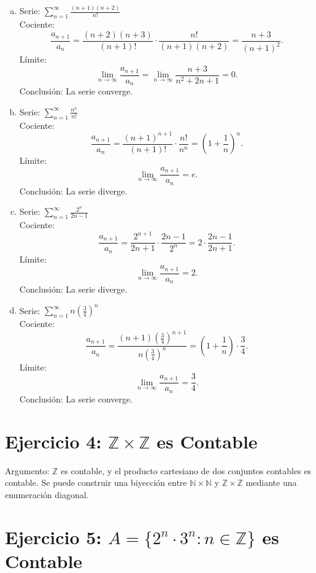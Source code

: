 \documentclass[12pt,a4paper]{article}
\begin{document}
\begin{enumerate}[a)]
    \item Serie: $\sum_{n=1}^{\infty} \frac{(n+1)(n+2)}{n!}$ \\
    Cociente:
    \[
    \frac{a_{n+1}}{a_n} = \frac{(n+2)(n+3)}{(n+1)!} \cdot \frac{n!}{(n+1)(n+2)} = \frac{n+3}{(n+1)^2}.
    \]
    Límite:
    \[
    \lim_{n \to \infty} \frac{a_{n+1}}{a_n} = \lim_{n \to \infty} \frac{n+3}{n^2 + 2n + 1} = 0.
    \]
    Conclusión: La serie converge.

    \item Serie: $\sum_{n=1}^{\infty} \frac{n^n}{n!}$ \\
    Cociente:
    \[
    \frac{a_{n+1}}{a_n} = \frac{(n+1)^{n+1}}{(n+1)!} \cdot \frac{n!}{n^n} = \left(1 + \frac{1}{n}\right)^n.
    \]
    Límite:
    \[
    \lim_{n \to \infty} \frac{a_{n+1}}{a_n} = e.
    \]
    Conclusión: La serie diverge.

    \item Serie: $\sum_{n=1}^{\infty} \frac{2^n}{2n - 1}$ \\
    Cociente:
    \[
    \frac{a_{n+1}}{a_n} = \frac{2^{n+1}}{2n+1} \cdot \frac{2n-1}{2^n} = 2 \cdot \frac{2n-1}{2n+1}.
    \]
    Límite:
    \[
    \lim_{n \to \infty} \frac{a_{n+1}}{a_n} = 2.
    \]
    Conclusión: La serie diverge.

    \item Serie: $\sum_{n=1}^{\infty} n \left( \frac{3}{4} \right)^n$ \\
    Cociente:
    \[
    \frac{a_{n+1}}{a_n} = \frac{(n+1)\left( \frac{3}{4} \right)^{n+1}}{n \left( \frac{3}{4} \right)^n} = \left(1 + \frac{1}{n}\right) \cdot \frac{3}{4}.
    \]
    Límite:
    \[
    \lim_{n \to \infty} \frac{a_{n+1}}{a_n} = \frac{3}{4}.
    \]
    Conclusión: La serie converge.
\end{enumerate}

\section*{Ejercicio 4: $\mathbb{Z} \times \mathbb{Z}$ es Contable}

Argumento: $\mathbb{Z}$ es contable, y el producto cartesiano de dos conjuntos contables es contable. Se puede construir una biyección entre $\mathbb{N} \times \mathbb{N}$ y $\mathbb{Z} \times \mathbb{Z}$ mediante una enumeración diagonal.

\section*{Ejercicio 5: $A = \{2^n \cdot 3^n : n \in \mathbb{Z}\}$ es Contable}
\end{document}
